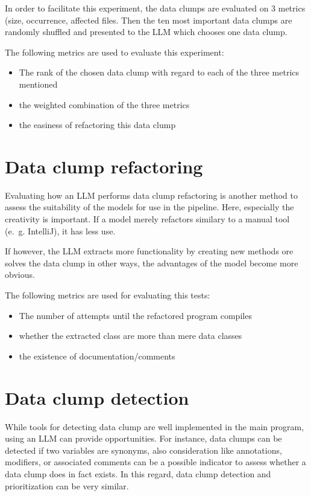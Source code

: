 In order to facilitate this experiment, the data clumps are evaluated on 3 metrics (size, occurrence, affected files. Then the ten most important data clumps are randomly shuffled and presented to the \ac{LLM} which chooses one data clump. 

The following metrics are used to evaluate this experiment:
\begin{itemize}
    \item The rank of the chosen data clump with regard to each of the three metrics mentioned
    \item the weighted combination of the three metrics
    \item the easiness of refactoring this data clump
\end{itemize}


\section{Data clump refactoring}

Evaluating how an \ac{LLM} performs data clump refactoring is another method to assess the suitability of the models for use in the pipeline. Here, especially the creativity is important. If a model merely refactors similary to a manual tool (e.~g. IntelliJ), it has less use.

If however, the \ac{LLM} extracts more functionality by creating new methods ore solves the data clump in other ways, the advantages of the model become more obvious.


The following metrics are used for evaluating this tests:

\begin{itemize}
    \item The number of attempts until the refactored program compiles
    \item whether the extracted class are more than mere data classes
    \item the existence of documentation/comments
\end{itemize}

\section{Data clump detection}

While tools for detecting data clump are well implemented in the main program, using an \ac{LLM} can provide opportunities. For instance, data clumps can be detected if two variables are synonyms, also consideration like annotations, modifiers, or associated comments can be a possible indicator to assess whether a data clump does in fact exists. In this regard, data clump detection and prioritization can be very similar. 

